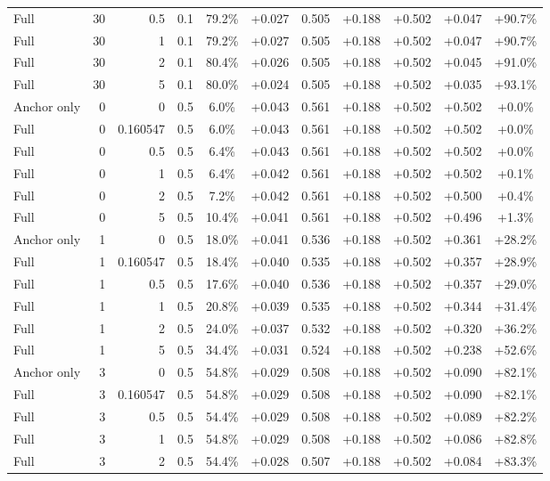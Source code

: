 \begin{table}[htbp]
\begin{tabular}{lrrrccccccc}
Full & 30 & 0.5 & 0.1 & 79.2\% & +0.027 & 0.505 & +0.188 & +0.502 & +0.047 & +90.7\% \\
Full & 30 & 1 & 0.1 & 79.2\% & +0.027 & 0.505 & +0.188 & +0.502 & +0.047 & +90.7\% \\
Full & 30 & 2 & 0.1 & 80.4\% & +0.026 & 0.505 & +0.188 & +0.502 & +0.045 & +91.0\% \\
Full & 30 & 5 & 0.1 & 80.0\% & +0.024 & 0.505 & +0.188 & +0.502 & +0.035 & +93.1\% \\
Anchor only & 0 & 0 & 0.5 & 6.0\% & +0.043 & 0.561 & +0.188 & +0.502 & +0.502 & +0.0\% \\
Full & 0 & 0.160547 & 0.5 & 6.0\% & +0.043 & 0.561 & +0.188 & +0.502 & +0.502 & +0.0\% \\
Full & 0 & 0.5 & 0.5 & 6.4\% & +0.043 & 0.561 & +0.188 & +0.502 & +0.502 & +0.0\% \\
Full & 0 & 1 & 0.5 & 6.4\% & +0.042 & 0.561 & +0.188 & +0.502 & +0.502 & +0.1\% \\
Full & 0 & 2 & 0.5 & 7.2\% & +0.042 & 0.561 & +0.188 & +0.502 & +0.500 & +0.4\% \\
Full & 0 & 5 & 0.5 & 10.4\% & +0.041 & 0.561 & +0.188 & +0.502 & +0.496 & +1.3\% \\
Anchor only & 1 & 0 & 0.5 & 18.0\% & +0.041 & 0.536 & +0.188 & +0.502 & +0.361 & +28.2\% \\
Full & 1 & 0.160547 & 0.5 & 18.4\% & +0.040 & 0.535 & +0.188 & +0.502 & +0.357 & +28.9\% \\
Full & 1 & 0.5 & 0.5 & 17.6\% & +0.040 & 0.536 & +0.188 & +0.502 & +0.357 & +29.0\% \\
Full & 1 & 1 & 0.5 & 20.8\% & +0.039 & 0.535 & +0.188 & +0.502 & +0.344 & +31.4\% \\
Full & 1 & 2 & 0.5 & 24.0\% & +0.037 & 0.532 & +0.188 & +0.502 & +0.320 & +36.2\% \\
Full & 1 & 5 & 0.5 & 34.4\% & +0.031 & 0.524 & +0.188 & +0.502 & +0.238 & +52.6\% \\
Anchor only & 3 & 0 & 0.5 & 54.8\% & +0.029 & 0.508 & +0.188 & +0.502 & +0.090 & +82.1\% \\
Full & 3 & 0.160547 & 0.5 & 54.8\% & +0.029 & 0.508 & +0.188 & +0.502 & +0.090 & +82.1\% \\
Full & 3 & 0.5 & 0.5 & 54.4\% & +0.029 & 0.508 & +0.188 & +0.502 & +0.089 & +82.2\% \\
Full & 3 & 1 & 0.5 & 54.8\% & +0.029 & 0.508 & +0.188 & +0.502 & +0.086 & +82.8\% \\
Full & 3 & 2 & 0.5 & 54.4\% & +0.028 & 0.507 & +0.188 & +0.502 & +0.084 & +83.3\% \\

\end{tabular}
\end{table}
